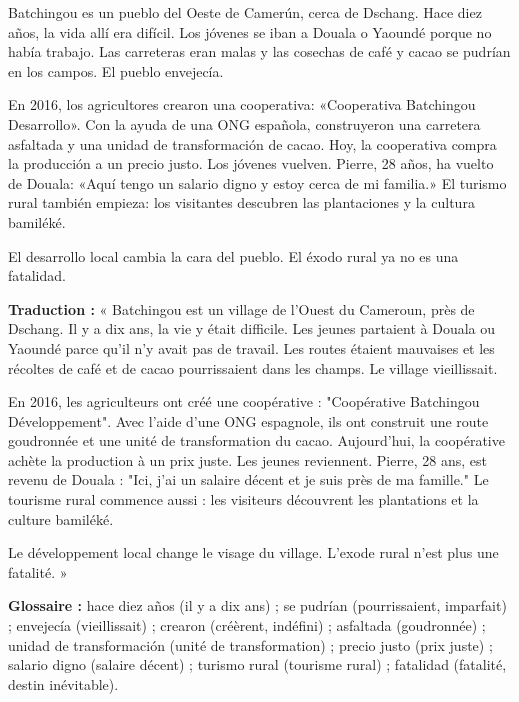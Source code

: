 \documentclass[11pt]{article}
\newcommand{\cle}[1]{{\popxbold\color{popdark}#1}}
\begin{document}
\begin{textebox}
Batchingou es un pueblo del Oeste de Camerún, cerca de Dschang. Hace diez años, la vida allí era difícil. Los jóvenes se iban a Douala o Yaoundé porque no había trabajo. Las carreteras eran malas y las cosechas de café y cacao se pudrían en los campos. El pueblo envejecía.

En 2016, los agricultores crearon una cooperativa: «Cooperativa Batchingou Desarrollo». Con la ayuda de una ONG española, construyeron una carretera asfaltada y una unidad de transformación de cacao. Hoy, la cooperativa compra la producción a un precio justo. Los jóvenes vuelven. Pierre, 28 años, ha vuelto de Douala: «Aquí tengo un salario digno y estoy cerca de mi familia.» El turismo rural también empieza: los visitantes descubren las plantaciones y la cultura bamiléké.

El desarrollo local cambia la cara del pueblo. El éxodo rural ya no es una fatalidad.
\end{textebox}

\begin{definition}
\textbf{Traduction :} « Batchingou est un village de l'Ouest du Cameroun, près de Dschang. Il y a dix ans, la vie y était difficile. Les jeunes partaient à Douala ou Yaoundé parce qu'il n'y avait pas de travail. Les routes étaient mauvaises et les récoltes de café et de cacao pourrissaient dans les champs. Le village vieillissait.

En 2016, les agriculteurs ont créé une coopérative : "Coopérative Batchingou Développement". Avec l'aide d'une ONG espagnole, ils ont construit une route goudronnée et une unité de transformation du cacao. Aujourd'hui, la coopérative achète la production à un prix juste. Les jeunes reviennent. Pierre, 28 ans, est revenu de Douala : "Ici, j'ai un salaire décent et je suis près de ma famille." Le tourisme rural commence aussi : les visiteurs découvrent les plantations et la culture bamiléké.

Le développement local change le visage du village. L'exode rural n'est plus une fatalité. »

\textbf{Glossaire :} \cle{hace diez años} (il y a dix ans) ; \cle{se pudrían} (pourrissaient, imparfait) ; \cle{envejecía} (vieillissait) ; \cle{crearon} (créèrent, indéfini) ; \cle{asfaltada} (goudronnée) ; \cle{unidad de transformación} (unité de transformation) ; \cle{precio justo} (prix juste) ; \cle{salario digno} (salaire décent) ; \cle{turismo rural} (tourisme rural) ; \cle{fatalidad} (fatalité, destin inévitable).
\end{definition}
\end{document}
